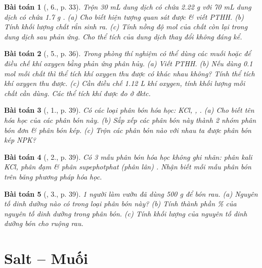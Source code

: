 \documentclass{article}
\newtheorem{baitoan}{Bài toán}
\begin{document}
\begin{baitoan}[\cite{SGK_Hoa_Hoc_9}, 6., p. 33]
	Trộn {\rm30 mL} dung dịch có chứa {\rm2.22 g } với {\rm70 mL} dung dịch có chứa {\rm1.7 g }. (a) Cho biết hiện tượng quan sát được \& viết PTHH. (b) Tính khối lượng chất rắn sinh ra. (c) Tính nồng độ mol của chất còn lại trong dung dịch sau phản ứng. Cho thể tích của dung dịch thay đổi không đáng kể.
\end{baitoan}

\begin{baitoan}[\cite{SGK_Hoa_Hoc_9}, 5., p. 36]
	Trong phòng thí nghiệm có thể dùng các muối {\rm{}} hoặc {\rm{}} để điều chế khí oxygen bằng phản ứng phân hủy. (a) Viết {\rm PTHH}. (b) Nếu dùng {\rm0.1 mol} mỗi chất thì thể tích khí oxygen thu được có khác nhau không? Tính thể tích khí oxygen thu được. (c) Cần điều chế {\rm1.12 L} khí oxygen, tính khối lượng mỗi chất cần dùng. Các thể tích khí được đo ở đktc.
\end{baitoan}

\begin{baitoan}[\cite{SGK_Hoa_Hoc_9}, 1., p. 39]
	Có các loại phân bón hóa học: {\rm KCl, , }. (a) Cho biết tên hóa học của các phân bón này. (b) Sắp xếp các phân bón này thành 2 nhóm phân bón đơn \& phân bón kép. (c) Trộn các phân bón nào với nhau ta được phân bón kép NPK?
\end{baitoan}

\begin{baitoan}[\cite{SGK_Hoa_Hoc_9}, 2., p. 39]
	Có 3 mẫu phân bón hóa học không ghi nhãn: phân kali {\rm KCl}, phân đạm {\rm{}} \& phân supephotphat (phân lân) {\rm{}}. Nhận biết mỗi mẫu phân bón trên băng phương pháp hóa học.
\end{baitoan}

\begin{baitoan}[\cite{SGK_Hoa_Hoc_9}, 3., p. 39]
	1 người làm vườn đã dùng {\rm500 g } để bón rau. (a) Nguyên tố dinh dưỡng nào có trong loại phân bón này? (b) Tính thành phần \% của nguyên tố dinh dưỡng trong phân bón. (c) Tính khối lượng của nguyên tố dinh dưỡng bón cho ruộng rau.
\end{baitoan}


\section{Salt -- Muối}
\end{document}
